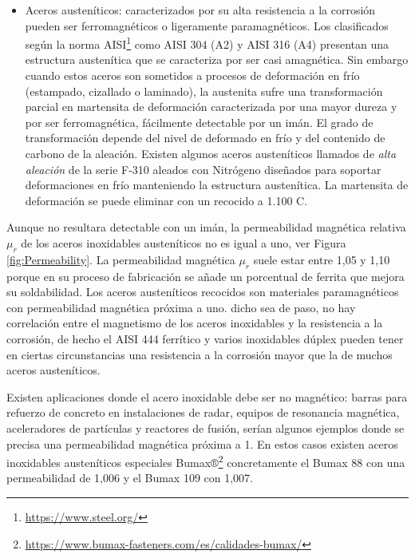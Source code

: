 \begin{itemize}
	\item Aceros austeníticos: caracterizados por su alta resistencia a la corrosión pueden ser ferromagnéticos o ligeramente paramagnéticos. Los clasificados según la norma AISI\footnote{\url{https://www.steel.org/}} como AISI 304 (A2) y AISI 316 (A4) presentan una estructura austenítica que se caracteriza por ser casi amagnética. Sin embargo cuando estos aceros son sometidos a procesos de deformación en frío (estampado, cizallado o laminado), la austenita sufre una transformación parcial en martensita de deformación caracterizada por una mayor dureza y por ser ferromagnética, fácilmente detectable por un imán. El grado de transformación depende del nivel de deformado en frío y del contenido de carbono de la aleación. Existen algunos aceros austeníticos llamados de \emph{alta aleación} de la serie F-310 aleados con Nitrógeno diseñados para soportar deformaciones en frío manteniendo la estructura austenítica. La martensita de deformación se puede eliminar con un recocido a 1.100 \textdegree C. 	
\end{itemize}


Aunque no resultara detectable con un imán, la permeabilidad magnética relativa $\mu_{r}$ de los aceros inoxidables austeníticos no es igual a uno, ver Figura \ref{fig:Permeability}. La permeabilidad magnética $\mu_{r}$ suele estar entre 1,05 y 1,10 porque en su proceso de fabricación se añade un porcentual de ferrita que mejora su soldabilidad. Los aceros austeníticos recocidos son materiales paramagnéticos con permeabilidad magnética próxima a uno. dicho sea de paso, no hay correlación entre el magnetismo de los aceros inoxidables y la resistencia a la corrosión, de hecho el AISI 444 ferrítico y varios inoxidables dúplex pueden tener en ciertas circunstancias una resistencia a la corrosión mayor que la de muchos aceros austeníticos.

Existen aplicaciones donde el acero inoxidable debe ser no magnético: barras para refuerzo de concreto en instalaciones de radar, equipos de resonancia magnética, aceleradores de partículas y reactores de fusión, serían algunos ejemplos donde se precisa una permeabilidad magnética próxima a 1. En estos casos existen aceros inoxidables austeníticos especiales Bumax®\footnote{\url{https://www.bumax-fasteners.com/es/calidades-bumax/}} concretamente el Bumax 88 con una permeabilidad de 1,006 y el Bumax 109 con 1,007.

